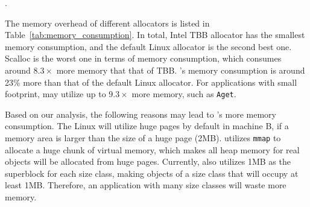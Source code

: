 

. 

The memory overhead of different allocators is listed in Table~\ref{tab:memory_consumption}. In total, Intel TBB allocator has the smallest memory consumption, and the default Linux allocator is the second best one. Scalloc is the worst one in terms of memory consumption, which consumes around  $8.3\times$ more memory that that of TBB.  \NM{}'s memory consumption is around 23\% more than that of the default Linux allocator. For applications with small footprint, \NM{} may utilize up to $9.3\times$ more memory, such as \texttt{Aget}.
 
 Based on our analysis, the following reasons may lead to \NM{}'s more memory consumption. The Linux will utilize huge pages by default in machine B, if a memory area is larger than the size of a huge page (2MB). \NM{} utilizes \texttt{mmap} to allocate a huge chunk of virtual memory, which makes all heap memory for real objects will be allocated from huge pages. Currently, \NM{} also utilizes 1MB as the superblock for each size class, making objects of a size class that will occupy at least 1MB. Therefore, an application with many size classes will waste more memory.  
 
    

